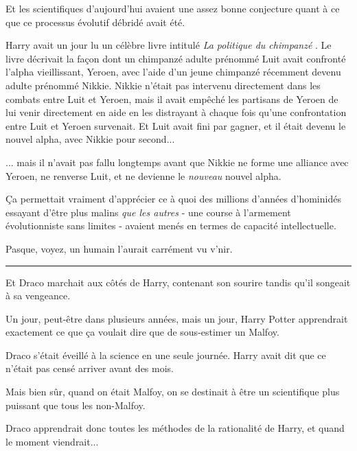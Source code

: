 Et les scientifiques d'aujourd'hui avaient une assez bonne conjecture quant à ce que ce processus évolutif débridé avait été.

Harry avait un jour lu un célèbre livre intitulé \emph{La politique du chimpanzé} . Le livre décrivait la façon dont un chimpanzé adulte prénommé Luit avait confronté l'alpha vieillissant, Yeroen, avec l'aide d'un jeune chimpanzé récemment devenu adulte prénommé Nikkie. Nikkie n'était pas intervenu directement dans les combats entre Luit et Yeroen, mais il avait empêché les partisans de Yeroen de lui venir directement en aide en les distrayant à chaque fois qu'une confrontation entre Luit et Yeroen survenait. Et Luit avait fini par gagner, et il était devenu le nouvel alpha, avec Nikkie pour second...

... mais il n'avait pas fallu longtemps avant que Nikkie ne forme une alliance avec Yeroen, ne renverse Luit, et ne devienne le \emph{nouveau}  nouvel alpha.

Ça permettait vraiment d'apprécier ce à quoi des millions d'années d'hominidés essayant d'être plus malins \emph{que les autres}  - une course à l'armement évolutionniste sans limites - avaient menés en termes de capacité intellectuelle.

Pasque, voyez, un humain l'aurait carrément vu v'nir.
\par\noindent\rule{\textwidth}{0.4pt}
Et Draco marchait aux côtés de Harry, contenant son sourire tandis qu'il songeait à sa vengeance.

Un jour, peut-être dans plusieurs années, mais un jour, Harry Potter apprendrait exactement ce que ça voulait dire que de sous-estimer un Malfoy.

Draco s'était éveillé à la science en une seule journée. Harry avait dit que ce n'était pas censé arriver avant des mois.

Mais bien sûr, quand on était Malfoy, on se destinait à être un scientifique plus puissant que tous les non-Malfoy.

Draco apprendrait donc toutes les méthodes de la rationalité de Harry, et quand le moment viendrait...

